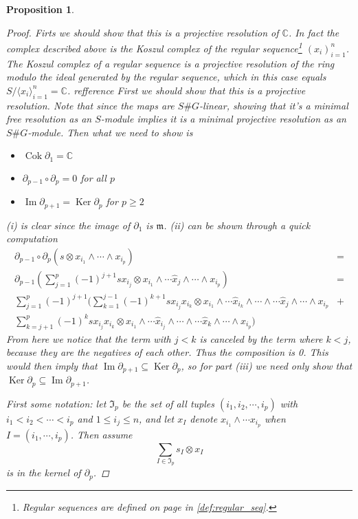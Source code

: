 \documentclass[11pt, a4paper, english]{article}
\newtheorem{prop}{Proposition}
\numberwithin{prop}{section}
\numberwithin{lemma}{section}
\numberwithin{theorem}{section}
\numberwithin{defin}{section}
\numberwithin{example}{section}
\newcommand{\C}{\mathbb{C}}
\DeclareMathOperator{\Image}{Im}
\DeclareMathOperator{\Ker}{Ker}
\DeclareMathOperator{\Cok}{Cok}
\begin{document}
\begin{prop}
\begin{proof}
Firts we should show that this is a projective resolution of $\C$. In fact the complex described above is the Koszul complex of the regular sequence\footnote{Regular sequences are defined on page \pageref{def:regular_seq} in \cref{def:regular_seq}.} $(x_i)_{i=1}^n$. The Koszul complex of a regular sequence is a projective resolution of the ring modulo the ideal generated by the regular sequence, which in this case equals $S/\langle x_i \rangle_{i=1}^n = \C$. {\color{red} refference}
\iffalse
First we should show that this is a projective resolution. Note that since the maps are $S\#G$-linear, showing that it's a minimal free resolution as an $S$-module implies it is a minimal projective resolution as an $S\#G$-module. Then what we need to show is 
\begin{itemize}
\item[(i)] $\Cok \partial_1 = \C$
\item[(ii)] $\partial_{p-1} \circ \partial_{p} = 0$ for all $p$
\item[(iii)] $\Image \partial_{p+1} = \Ker \partial_p$ for $p \geq 2$
\end{itemize}
(i) is clear since the image of $\partial_1$ is $\mathfrak{m}$. (ii) can be shown through a quick computation
\begin{align*}
\partial_{p-1} \circ \partial_{p}(s \otimes x_{i_1} \wedge \cdots \wedge x_{i_p}) &=\\ 
\partial_{p-1} \left(\sum_{j=1}^p (-1)^{j+1} sx_{i_j} \otimes x_{i_1} \wedge \cdots \hat{x}_j \wedge \cdots \wedge x_{i_p} \right)&=\\
\sum_{j=1}^p (-1)^{j+1} \Bigg(\sum_{k=1}^{j-1} (-1)^{k+1} sx_{i_j}x_{i_k} \otimes x_{i_1}\wedge \cdots \hat{x}_{i_k} \wedge \cdots \wedge \cdots \hat{x}_j \wedge \cdots \wedge x_{i_p}& +\\
\sum_{k=j+1}^{p} (-1)^k sx_{i_j}x_{i_k} \otimes x_{i_1}\wedge \cdots \hat{x}_{i_j} \wedge \cdots \wedge \cdots \hat{x}_k \wedge \cdots \wedge x_{i_p}\Bigg) &
\end{align*}
From here we notice that the term with $j < k$ is canceled by the term where $k < j$, because they are the negatives of each other. Thus the composition is 0. This would then imply that $\Image \partial_{p+1} \subseteq \Ker \partial_p$, so for part (iii) we need only show that $\Ker \partial_p \subseteq \Image \partial_{p+1}$.

First some notation: let $\mathfrak{I}_p$ be the set of all tuples $(i_1, i_2, \cdots, i_p)$ with $i_1 < i_2 < \cdots < i_p$ and $1 \leq i_j \leq n$, and let $x_I$ denote $x_{i_1} \wedge \cdots x_{i_p}$ when $I=(i_1, \cdots, i_p)$. Then assume $$ \sum_{I \in \mathfrak{I}_p} s_I \otimes x_I$$ is in the kernel of $\partial_p$. 



\end{proof}
\end{prop}
\end{document}
